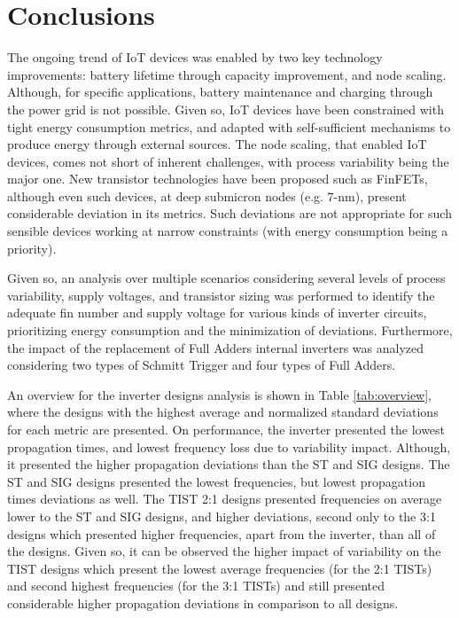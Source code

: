 \documentclass[diss,pgmicro,english]{iiufrgs}
\begin{document}


\chapter{Conclusions}

The ongoing trend of IoT devices was enabled by two key technology improvements: battery lifetime through capacity improvement, and node scaling. Although, for specific applications, battery maintenance and charging through the power grid is not possible. Given so, IoT devices have been constrained with tight energy consumption metrics, and adapted with self-sufficient mechanisms to produce energy through external sources. The node scaling, that enabled IoT devices, comes not short of inherent challenges, with process variability being the major one. New transistor technologies have been proposed such as FinFETs, although even such devices, at deep submicron nodes (e.g. 7-nm), present considerable deviation in its metrics. Such deviations are not appropriate for such sensible devices working at narrow constraints (with energy consumption being a priority).

Given so, an analysis over multiple scenarios considering several levels of process variability, supply voltages, and transistor sizing was performed to identify the adequate fin number and supply voltage for various kinds of inverter circuits, prioritizing energy consumption and the minimization of deviations. Furthermore, the impact of the replacement of Full Adders internal inverters was analyzed considering two types of Schmitt Trigger and four types of Full Adders.

An overview for the inverter designs analysis is shown in Table \ref{tab:overview}, where the designs with the highest average and normalized standard deviations for each metric are presented. On performance, the inverter presented the lowest propagation times, and lowest frequency loss due to variability impact. Although, it presented the higher propagation deviations than the ST and SIG designs. The ST and SIG designs presented the lowest frequencies, but lowest propagation times deviations as well. The TIST 2:1 designs presented frequencies on average lower to the ST and SIG designs, and higher deviations, second only to the 3:1 designs which presented higher frequencies, apart from the inverter, than all of the designs. Given so, it can be observed the higher impact of variability on the TIST designs which present the lowest average frequencies (for the 2:1 TISTs) and second highest frequencies (for the 3:1 TISTs) and still presented considerable higher propagation deviations in comparison to all designs.
\end{document}

